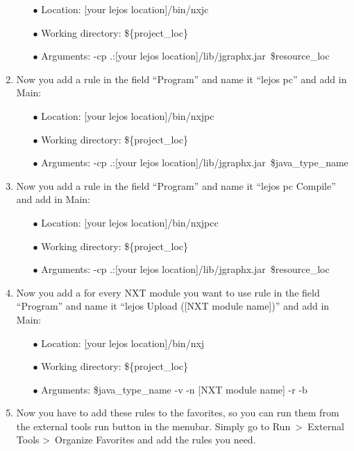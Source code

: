 \documentclass[%
  a4paper,%
  11pt,%
  blue,%
  hyperref	%
  ]{tubsartcl}
\begin{document}
\begin{enumerate}
	\begin{enumerate}
	\item[$\bullet$] Location: [your lejos location]/bin/nxjc
	\item[$\bullet$] Working directory: \$\{project\_loc\}
	\item[$\bullet$] Arguments: -cp \textquotedbl .:[your lejos location]/lib/jgraphx.jar\textquotedbl\ \${resource\_loc}
	\end{enumerate}
	\item Now you add a rule in the field ``Program'' and name it ``lejos pc'' and add in Main:
	\begin{enumerate}
	\item[$\bullet$] Location: [your lejos location]/bin/nxjpc
	\item[$\bullet$] Working directory: \$\{project\_loc\}
	\item[$\bullet$] Arguments: -cp \textquotedbl .:[your lejos location]/lib/jgraphx.jar\textquotedbl\ \${java\_type\_name}
	\end{enumerate}
	\item Now you add a rule in the field ``Program'' and name it ``lejos pc Compile'' and add in Main:
	\begin{enumerate}
	\item[$\bullet$] Location: [your lejos location]/bin/nxjpcc
	\item[$\bullet$] Working directory: \$\{project\_loc\}
	\item[$\bullet$] Arguments: -cp \textquotedbl .:[your lejos location]/lib/jgraphx.jar\textquotedbl\ \${resource\_loc}
	\end{enumerate}
	\item Now you add a for every NXT module you want to use rule in the field ``Program'' and name it ``lejos Upload ([NXT module name])'' and add in Main:
	\begin{enumerate}
	\item[$\bullet$] Location: [your lejos location]/bin/nxj
	\item[$\bullet$] Working directory: \$\{project\_loc\}
	\item[$\bullet$] Arguments: \${java\_type\_name} -v -n [NXT module name] -r -b
	\end{enumerate}
	\item Now you have to add these rules to the favorites, so you can run them from the external tools run button in the menubar. Simply go to Run\ \textgreater\ External Tools \textgreater\ Organize Favorites and add the rules you need.
\end{enumerate}
\end{document}

